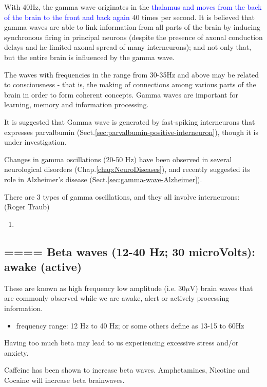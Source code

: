With 40Hz, the gamma wave originates in the \textcolor{blue}{thalamus and moves
from the back of the brain to the front and back again} 40 times per second. 
It is believed that gamma waves are able to link information from all parts of
the brain by inducing synchronous firing in principal neurons (despite the
presence of axonal conduction delays and he limited axonal spread of many
interneurons); and not only that, but the entire brain is influenced by the
gamma wave.

The waves with frequencies in the range from 30-35Hz and above may be related to
consciousness - that is, the making of connections among various parts of the
brain in order to form coherent concepts. Gamma waves are important for
learning, memory and information processing.

It is suggested that Gamma wave is generated by fast-spiking
interneurons that expresses parvalbumin
(Sect.\ref{sec:parvalbumin-positive-interneuron}), though it is under
investigation.

Changes in gamma oscillations (20-50 Hz) have been observed in several
neurological disorders (Chap.\ref{chap:NeuroDiseases}), and recently suggested
its role in Alzheimer's disease (Sect.\ref{sec:gamma-wave-Alzheimer}).

There are 3 types of gamma oscillations, and they all involve interneurons:
(Roger Traub)
\begin{enumerate}
  \item 
\end{enumerate}

\subsection{====  Beta waves (12-40 Hz; 30 microVolts): awake (active)}
\label{sec:beta-wave}


These are known as high frequency low amplitude (i.e. 30$\mu$V) brain waves that
are commonly observed while we are awake, alert or actively processing information.
\begin{itemize}
  \item frequency range: 12 Hz to 40 Hz; or some others define as 13-15 to 60Hz
\end{itemize}

Having too much beta may lead to us experiencing excessive stress and/or
anxiety. 

Caffeine has been shown to increase beta waves. Amphetamines, Nicotine and
Cocaine will increase beta brainwaves.

